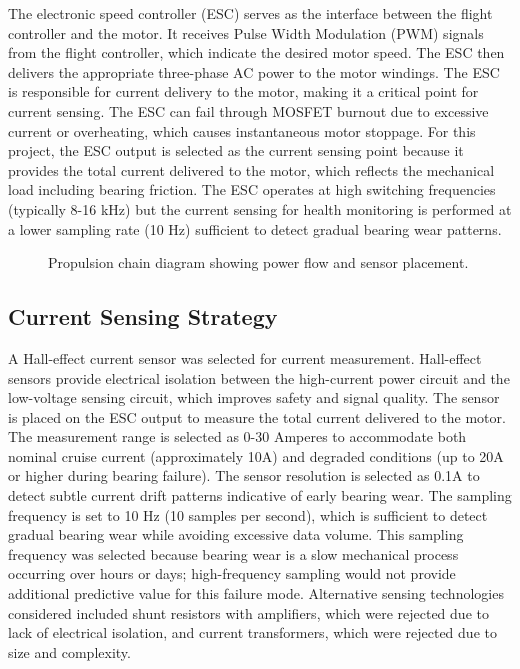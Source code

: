 The electronic speed controller (ESC) serves as the interface between the flight controller and the motor. It receives Pulse Width Modulation (PWM) signals from the flight controller, which indicate the desired motor speed. The ESC then delivers the appropriate three-phase AC power to the motor windings. The ESC is responsible for current delivery to the motor, making it a critical point for current sensing. The ESC can fail through MOSFET burnout due to excessive current or overheating, which causes instantaneous motor stoppage. For this project, the ESC output is selected as the current sensing point because it provides the total current delivered to the motor, which reflects the mechanical load including bearing friction. The ESC operates at high switching frequencies (typically 8-16 kHz) but the current sensing for health monitoring is performed at a lower sampling rate (10 Hz) sufficient to detect gradual bearing wear patterns.

\begin{figure}[H]
\centering
\caption{Propulsion chain diagram showing power flow and sensor placement.}
\label{fig:propulsion_chain}
\end{figure}

\subsection{Current Sensing Strategy}

A Hall-effect current sensor was selected for current measurement. Hall-effect sensors provide electrical isolation between the high-current power circuit and the low-voltage sensing circuit, which improves safety and signal quality. The sensor is placed on the ESC output to measure the total current delivered to the motor. The measurement range is selected as 0-30 Amperes to accommodate both nominal cruise current (approximately 10A) and degraded conditions (up to 20A or higher during bearing failure). The sensor resolution is selected as 0.1A to detect subtle current drift patterns indicative of early bearing wear. The sampling frequency is set to 10 Hz (10 samples per second), which is sufficient to detect gradual bearing wear while avoiding excessive data volume. This sampling frequency was selected because bearing wear is a slow mechanical process occurring over hours or days; high-frequency sampling would not provide additional predictive value for this failure mode. Alternative sensing technologies considered included shunt resistors with amplifiers, which were rejected due to lack of electrical isolation, and current transformers, which were rejected due to size and complexity.

